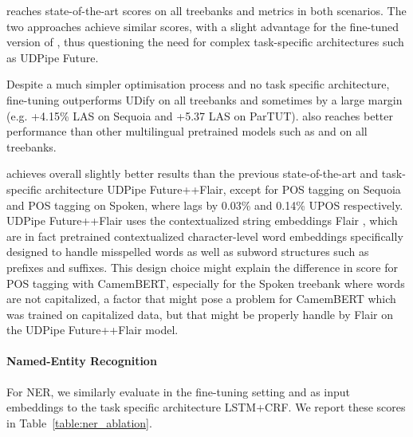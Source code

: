 \camembert reaches state-of-the-art scores on all treebanks and metrics in both scenarios. The two approaches achieve similar scores, with a slight advantage for the fine-tuned version of \camembert, thus questioning the need for complex task-specific architectures such as UDPipe Future.

Despite a much simpler optimisation process and no task specific architecture, fine-tuning \camembert outperforms UDify on all treebanks and sometimes by a large margin (e.g. +4.15\% LAS on Sequoia and +5.37 LAS on ParTUT).
\camembert also reaches better performance  than other multilingual pretrained models such as \mbert and \xlmmlmtlm on all treebanks.%

\camembert achieves overall slightly better results than the previous state-of-the-art and task-specific architecture UDPipe Future+\mbert+Flair, except for POS tagging on Sequoia and POS tagging on Spoken, where \camembert lags by 0.03\% and 0.14\% UPOS respectively.
UDPipe Future+\mbert+Flair uses the contextualized string embeddings Flair \citep{akbik-etal-2018-contextual}, which are in fact pretrained contextualized character-level word embeddings specifically designed to handle misspelled words as well as subword structures such as prefixes and suffixes. This design choice might explain the difference in score for POS tagging with CamemBERT, especially for the Spoken treebank where words are not capitalized, a factor that might pose a problem for CamemBERT which was trained on capitalized data, but that might be properly handle by Flair on the UDPipe Future+\mbert+Flair model.

\paragraph{Named-Entity Recognition}
For NER, we similarly evaluate \camembert in the fine-tuning setting and as input embeddings to the task specific architecture LSTM+CRF. We report these scores in Table~\ref{table:ner_ablation}.

